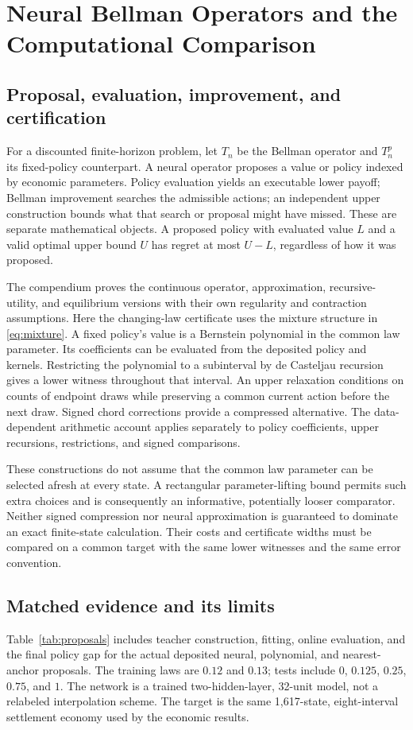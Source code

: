 \section{Neural Bellman Operators and the Computational Comparison}
\label{sec:computation}
\subsection{Proposal, evaluation, improvement, and certification}
For a discounted finite-horizon problem, let $T_n$ be the Bellman operator and $T_n^p$ its fixed-policy counterpart. A neural operator proposes a value or policy indexed by economic parameters. Policy evaluation yields an executable lower payoff; Bellman improvement searches the admissible actions; an independent upper construction bounds what that search or proposal might have missed. These are separate mathematical objects. A proposed policy with evaluated value $L$ and a valid optimal upper bound $U$ has regret at most $U-L$, regardless of how it was proposed.

The compendium proves the continuous operator, approximation, recursive-utility, and equilibrium versions with their own regularity and contraction assumptions. Here the changing-law certificate uses the mixture structure in \eqref{eq:mixture}. A fixed policy's value is a Bernstein polynomial in the common law parameter. Its coefficients can be evaluated from the deposited policy and kernels. Restricting the polynomial to a subinterval by de Casteljau recursion gives a lower witness throughout that interval. An upper relaxation conditions on counts of endpoint draws while preserving a common current action before the next draw. Signed chord corrections provide a compressed alternative. The data-dependent arithmetic account applies separately to policy coefficients, upper recursions, restrictions, and signed comparisons.

These constructions do not assume that the common law parameter can be selected afresh at every state. A rectangular parameter-lifting bound permits such extra choices and is consequently an informative, potentially looser comparator. Neither signed compression nor neural approximation is guaranteed to dominate an exact finite-state calculation. Their costs and certificate widths must be compared on a common target with the same lower witnesses and the same error convention.

\subsection{Matched evidence and its limits}
Table~\ref{tab:proposals} includes teacher construction, fitting, online evaluation, and the final policy gap for the actual deposited neural, polynomial, and nearest-anchor proposals. The training laws are $0.12$ and $0.13$; tests include $0$, $0.125$, $0.25$, $0.75$, and $1$. The network is a trained two-hidden-layer, 32-unit model, not a relabeled interpolation scheme. The target is the same 1,617-state, eight-interval settlement economy used by the economic results.


